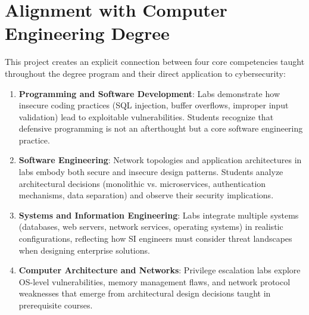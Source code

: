 \section{Alignment with Computer Engineering Degree}

This project creates an explicit connection between four core competencies 
taught throughout the degree program and their direct application to cybersecurity:

\begin{enumerate}
    \item \textbf{Programming and Software Development}: Labs demonstrate how 
          insecure coding practices (SQL injection, buffer overflows, improper 
          input validation) lead to exploitable vulnerabilities. Students 
          recognize that defensive programming is not an afterthought but a 
          core software engineering practice.
    
    \item \textbf{Software Engineering}: Network topologies and application 
          architectures in labs embody both secure and insecure design patterns. 
          Students analyze architectural decisions (monolithic vs. microservices, 
          authentication mechanisms, data separation) and observe their security 
          implications.
    
    \item \textbf{Systems and Information Engineering}: Labs integrate multiple 
          systems (databases, web servers, network services, operating systems) 
          in realistic configurations, reflecting how SI engineers must consider 
          threat landscapes when designing enterprise solutions.
    
    \item \textbf{Computer Architecture and Networks}: Privilege escalation labs 
          explore OS-level vulnerabilities, memory management flaws, and network 
          protocol weaknesses that emerge from architectural design decisions 
          taught in prerequisite courses.
\end{enumerate}

